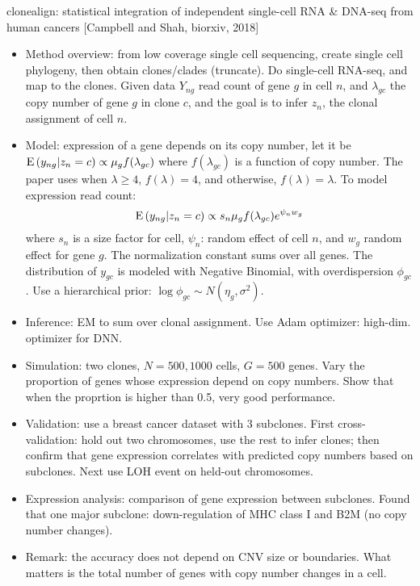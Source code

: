 \documentclass{report}
\begin{document}
clonealign: statistical integration of independent single-cell RNA \& DNA-seq from human cancers [Campbell and Shah, biorxiv, 2018]
\begin{itemize}
	\item Method overview: from low coverage single cell sequencing, create single cell phylogeny, then obtain clones/clades (truncate). Do single-cell RNA-seq, and map to the clones. Given data $Y_{ng}$ read count of gene $g$ in cell $n$, and $\lambda_{gc}$ the copy number of gene $g$ in clone $c$, and the goal is to infer $z_n$, the clonal assignment of cell $n$.  
	
	\item Model: expression of a gene depends on its copy number, let it be ${\rm E}\,(y_{ng}|z_n =c) \propto \mu_g f(\lambda_{gc})$ where $f(\lambda_{gc})$ is a function of copy number. The paper uses when $\lambda \geq 4$, $f(\lambda) = 4$, and otherwise, $f(\lambda) = \lambda$. To model expression read count: 
	\begin{equation}
	{\rm E}\,(y_{ng}|z_n =c) \propto s_n \mu_g f(\lambda_{gc}) e^{\psi_n w_g}
	\end{equation}
	where $s_n$ is a size factor for cell, $\psi_n$: random effect of cell $n$, and $w_g$ random effect for gene $g$. The normalization constant sums over all genes. The distribution of $y_{gc}$ is modeled with Negative Binomial, with overdispersion $\phi_{gc}$. Use a hierarchical prior: $\log \phi_{gc} \sim N(\eta_g, \sigma^2)$. 
	
	\item Inference: EM to sum over clonal assignment. Use Adam optimizer: high-dim. optimizer for DNN. 
	
	\item Simulation: two clones, $N = 500, 1000$ cells, $G = 500$ genes. Vary the proportion of genes whose expression depend on copy numbers. Show that when the proprtion is higher than 0.5, very good performance. 
	
	\item Validation: use a breast cancer dataset with 3 subclones. First cross-validation: hold out two chromosomes, use the rest to infer clones; then confirm that gene expression correlates with predicted copy numbers based on subclones. Next use LOH event on held-out chromosomes. 
	
	\item Expression analysis: comparison of gene expression between subclones. Found that one major subclone: down-regulation of MHC class I and B2M (no copy number changes). 
	
	\item Remark: the accuracy does not depend on CNV size or boundaries. What matters is the total number of genes with copy number changes in a cell. 
	
\end{itemize}
\end{document}
